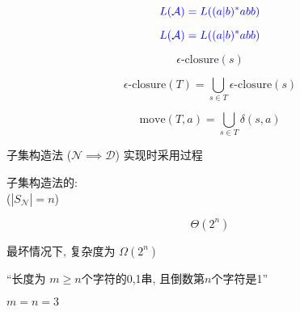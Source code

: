 \begin{frame}{}
  \begin{center}

    \[
      \textcolor{blue}{L(\mathcal{A}) = L((a|b)^{\ast}abb)}
    \]
  \end{center}
\end{frame}

\begin{frame}{}
  \begin{center}
    \[
      \textcolor{blue}{L(\mathcal{A}) = L((a|b)^{\ast}abb)}
    \]
  \end{center}
\end{frame}

\begin{frame}{}
  \[
    \epsilon\text{-closure}(s)
  \]

  \pause
  \vspace{0.60cm}
  \[
    \epsilon\text{-closure}(T) = \bigcup_{s \in T} \epsilon\text{-closure}(s)
  \]

  \pause
  \vspace{0.60cm}
  \[
    \text{move}(T, a) = \bigcup_{s \in T} \delta(s, a)
  \]
\end{frame}

\begin{frame}{}
  \begin{center}
    子集构造法 ($\mathcal{N} \implies \mathcal{D}$) 实现时采用过程


  \end{center}
\end{frame}

\begin{frame}{}
  \begin{center}
    子集构造法的: \\
    ($|S_{\mathcal{N}}| = n$)

    \[
      \Theta(2^n)
    \]

    \pause
    \vspace{0.30cm}
    最坏情况下, 复杂度为 $\Omega(2^n)$

    \pause
    \vspace{0.50cm}
    ``长度为 $m \ge n$个字符的0,1串, 且倒数第$n$个字符是1''

    \pause
    \vspace{0.80cm}
     $m = n = 3$
  \end{center}
\end{frame}

\begin{frame}{}
\end{frame}
